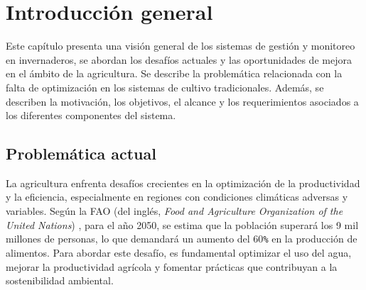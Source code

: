 
\chapter{Introducción general} %

\label{Chapter1} %
\label{IntroGeneral}

Este capítulo presenta una visión general de los sistemas de gestión y
monitoreo en invernaderos, se abordan los desafíos actuales y las oportunidades
de mejora en el ámbito de la agricultura. Se describe la problemática
relacionada con la falta de optimización en los sistemas de cultivo
tradicionales. Además, se describen la motivación, los objetivos, el alcance y
los requerimientos asociados a los diferentes componentes del sistema.


\newcommand{\keyword}[1]{\textbf{#1}}
\newcommand{\tabhead}[1]{\textbf{#1}}
\newcommand{\code}[1]{\texttt{#1}}
\newcommand{\file}[1]{\texttt{\bfseries#1}}
\newcommand{\option}[1]{\texttt{\itshape#1}}
\newcommand{\grados}{$^{\circ}$}



\section{Problemática actual}

La agricultura enfrenta desafíos crecientes en la optimización de la
productividad y la eficiencia, especialmente en regiones con condiciones
climáticas adversas y variables. Según la FAO (del inglés, \textit{Food and
      Agriculture Organization of the United Nations}) \cite{GAPReport2016}, para el
año 2050, se estima que la población superará los 9 mil millones de personas,
lo que demandará un aumento del 60\code{\%} en la producción de alimentos. Para
abordar este desafío, es fundamental optimizar el uso del agua, mejorar la
productividad agrícola y fomentar prácticas que contribuyan a la sostenibilidad
ambiental.

